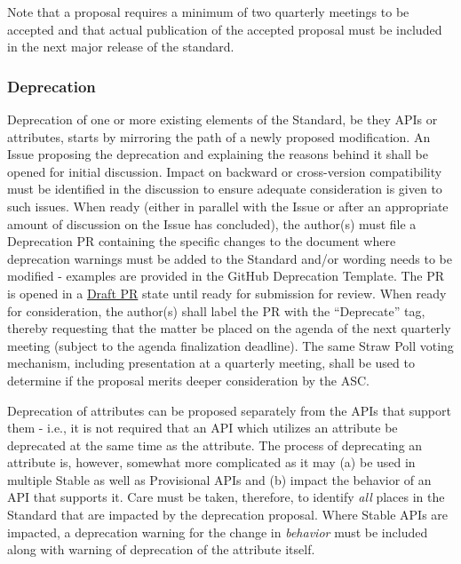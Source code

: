 \documentclass{article}
\begin{document}
Note that a proposal requires a minimum of two quarterly meetings to be
accepted and that actual publication of the accepted proposal must be
included in the next major release of the standard.

\hypertarget{deprecation}{%
\subsubsection{Deprecation}\label{deprecation}}

Deprecation of one or more existing elements of the Standard, be they
APIs or attributes, starts by mirroring the path of a newly proposed
modification. An Issue proposing the deprecation and explaining the
reasons behind it shall be opened for initial discussion. Impact on
backward or cross-version compatibility must be identified in the
discussion to ensure adequate consideration is given to such issues.
When ready (either in parallel with the Issue or after an appropriate
amount of discussion on the Issue has concluded), the author(s) must
file a Deprecation PR containing the specific changes to the document
where deprecation warnings must be added to the Standard and/or wording
needs to be modified - examples are provided in the GitHub Deprecation
Template. The PR is opened in a
\href{https://github.blog/2019-02-14-introducing-draft-pull-requests/}{Draft
PR} state until ready for submission for review. When ready for
consideration, the author(s) shall label the PR with the ``Deprecate''
tag, thereby requesting that the matter be placed on the agenda of the
next quarterly meeting (subject to the agenda finalization deadline). The same
Straw Poll voting mechanism, including presentation at a
quarterly meeting, shall be used to determine if the proposal merits
deeper consideration by the ASC.

Deprecation of attributes can be proposed separately from the APIs that
support them - i.e., it is not required that an API which utilizes an
attribute be deprecated at the same time as the attribute. The process
of deprecating an attribute is, however, somewhat more complicated as it
may (a) be used in multiple Stable as well as Provisional APIs
and (b) impact the behavior of an API that supports it. Care must be
taken, therefore, to identify \emph{all} places in the Standard that are
impacted by the deprecation proposal. Where Stable APIs are
impacted, a deprecation warning for the change in \emph{behavior} must
be included along with warning of deprecation of the attribute itself.
\end{document}
